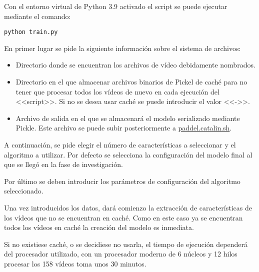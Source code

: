 Con el entorno virtual de Python 3.9 activado el script se puede ejecutar
mediante el comando:

\texttt{python train.py}

En primer lugar se pide la siguiente información sobre el sistema de archivos:

\begin{itemize}
    \item Directorio donde se encuentran los archivos de vídeo debidamente
    nombrados.
    \item Directorio en el que almacenar archivos binarios de Pickel de caché
    para no tener que procesar todos los vídeos de nuevo en cada ejecución del
    <<script>>. Si no se desea usar caché se puede introducir el valor <<->>.
    \item Archivo de salida en el que se almacenará el modelo serializado
    mediante Pickle. Este archivo se puede subir posteriormente a
    \href{https://paddel.catalin.sh}{paddel.catalin.sh}.
\end{itemize}


A continuación, se pide elegir el número de características a seleccionar y el
algoritmo a utilizar. Por defecto se selecciona la configuración del modelo
final al que se llegó en la fase de investigación.


Por último se deben introducir los parámetros de configuración del algoritmo
seleccionado.


Una vez introducidos los datos, dará comienzo la extracción de características
de los vídeos que no se encuentran en caché. Como en este caso ya se encuentran
todos los vídeos en caché la creación del modelo es inmediata.

Si no existiese caché, o se decidiese no usarla, el tiempo de ejecución
dependerá del procesador utilizado, con un procesador moderno de 6 núcleos y 12
hilos procesar los 158 vídeos toma unos 30 minutos.

